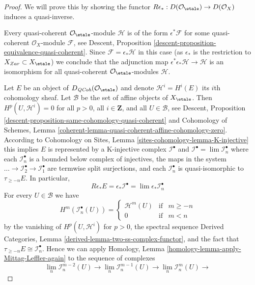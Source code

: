 \begin{proof}
We will prove this by showing the functor
$R\epsilon_* : D(\mathcal{O}_\etale) \to D(\mathcal{O}_X)$
induces a quasi-inverse.

\medskip\noindent
Every quasi-coherent $\mathcal{O}_\etale$-module
$\mathcal{H}$ is of the form $\epsilon^*\mathcal{F}$ for some quasi-coherent
$\mathcal{O}_X$-module $\mathcal{F}$, see
Descent, Proposition \ref{descent-proposition-equivalence-quasi-coherent}.
Since $\mathcal{F} = \epsilon_*\mathcal{H}$ in this case
(as $\epsilon_*$ is the restriction to $X_{Zar} \subset X_\etale$)
we conclude that the adjunction map
$\epsilon^*\epsilon_*\mathcal{H} \to \mathcal{H}$ is an isomorphism for all
quasi-coherent $\mathcal{O}_\etale$-modules $\mathcal{H}$.

\medskip\noindent
Let $E$ be an object of $D_{\textit{QCoh}}(\mathcal{O}_\etale)$
and denote $\mathcal{H}^i = H^i(E)$ its $i$th cohomology
sheaf. Let $\mathcal{B}$ be the set of affine objects of $X_\etale$.
Then $H^p(U, \mathcal{H}^i) = 0$ for all $p > 0$, all $i \in \mathbf{Z}$,
and all $U \in \mathcal{B}$, see
Descent, Proposition \ref{descent-proposition-same-cohomology-quasi-coherent}
and
Cohomology of Schemes, Lemma
\ref{coherent-lemma-quasi-coherent-affine-cohomology-zero}.
According to
Cohomology on Sites, Lemma \ref{sites-cohomology-lemma-K-injective}
this implies $E$ is represented by a K-injective complex
$\mathcal{I}^\bullet$ and
$\mathcal{I}^\bullet = \lim \mathcal{I}_n^\bullet$ where
each $\mathcal{I}_n^\bullet$ is a bounded below complex of injectives,
the maps in the system
$\ldots \to \mathcal{I}_2^\bullet \to \mathcal{I}_1^\bullet$
are termwise split surjections, and each $\mathcal{I}_n^\bullet$ is
quasi-isomorphic to $\tau_{\geq -n}E$.
In particular,
$$
R\epsilon_*E = \epsilon_*\mathcal{I}^\bullet =
\lim \epsilon_*\mathcal{I}_n^\bullet
$$
For every $U \in \mathcal{B}$ we have
$$
H^m(\mathcal{I}_n^\bullet(U)) =
\left\{
\begin{matrix}
\mathcal{H}^m(U) & \text{if} & m \geq -n \\
0 & \text{if} & m < n
\end{matrix}
\right.
$$
by the vanishing of $H^p(U, \mathcal{H}^i)$ for $p > 0$,
the spectral sequence
Derived Categories, Lemma \ref{derived-lemma-two-ss-complex-functor}, and
the fact that $\tau_{\geq -n}E \cong \mathcal{I}_n^\bullet$. Hence we can apply
Homology, Lemma \ref{homology-lemma-apply-Mittag-Leffler-again}
to the sequence of complexes
$$
\lim_n \mathcal{I}_n^{m - 2}(U) \to
\lim_n \mathcal{I}_n^{m - 1}(U) \to
\lim_n \mathcal{I}_n^m(U) \to
$$
\end{proof}

